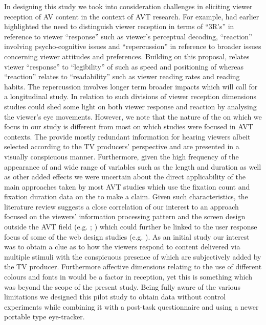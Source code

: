 \documentclass[output=paper]{langsci/langscibook}
\begin{document}
In designing this study we took into consideration challenges in eliciting viewer reception of AV content in the context of AVT research.  For example, \citet{kovacic1995} had earlier highlighted the need to distinguish viewer reception in terms of ``3R's'' in reference to viewer ``response'' such as viewer's perceptual decoding, ``reaction'' involving psycho-cognitive issues and ``repercussion'' in reference to broader issues concerning viewer attitudes and preferences. Building on this proposal, \citet[56--57]{gambier2013} relates viewer ``response'' to ``legibility'' of  such as speed and positioning of  whereas ``reaction'' relates to ``readability'' such as viewer reading rates and reading habits. The repercussion involves longer term broader impacts which will call for a longitudinal study.  In relation to such divisions of viewer reception dimensions  studies could shed some light on both viewer response and reaction by analysing the viewer's eye movements.  However, we note that the nature of the  on which we focus in our study is different from most  on which  studies were focused in AVT contexts. The  provide mostly redundant information for hearing viewers albeit selected according to the TV producers' perspective and are presented in a visually conspicuous manner. Furthermore, given the high frequency of the appearance of  and wide range of variables such as the length and duration as well as other added effects we were uncertain about the direct applicability of the main approaches taken by most AVT  studies which use the fixation count and fixation duration data on the  to make a claim.  Given such characteristics, the literature review suggests a close correlation of our interest to an approach focused on the viewers' information processing pattern and the screen design outside the AVT field (e.g. \citealt{josephson2006}; \citealt{Matsukawa2009}) which could further be linked to the user response focus of some of the web design  studies (e.g. \citealt{Nielsen2010}). As an initial study our interest was to obtain a clue as to how the viewers respond to content delivered via multiple stimuli with the conspicuous presence of  which are subjectively added by the TV producer. Furthermore affective dimensions relating to the use of different colours and fonts in  would be a factor in reception, yet this is something which was beyond the scope of the present study. Being fully aware of the various limitations we designed this pilot study to obtain data without control experiments while combining it with a post-task questionnaire and using a newer portable type eye-tracker. 
\end{document}
